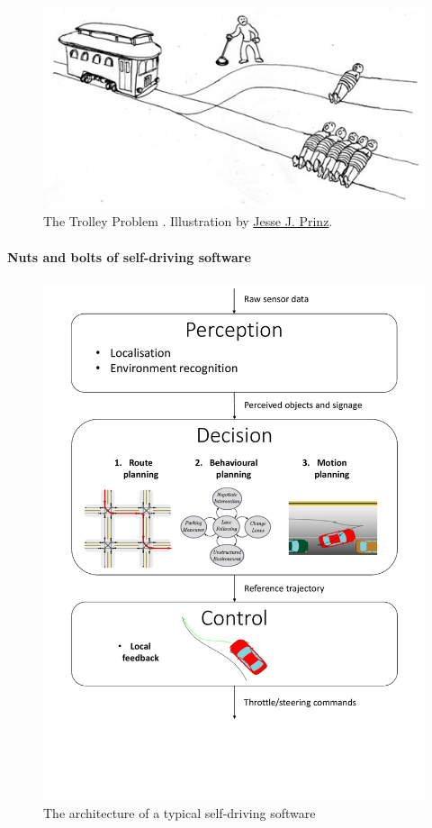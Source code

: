 \begin{figure}[tp]
	\centering
	\includegraphics[width=0.7\linewidth]{img/trolley}
	\caption{The Trolley Problem \citep{Foot1967}. Illustration by \href{http://subcortex.com/}{Jesse J. Prinz}.}
	\label{fig:trolley}
\end{figure}

\paragraph{Nuts and bolts of self-driving software}

\begin{figure}[tp]
	\centering
	\includegraphics[width=0.8\linewidth]{img/pipeline}
	\caption{The architecture of a typical self-driving software}
	\label{fig:robotics-pipeline}
\end{figure}

